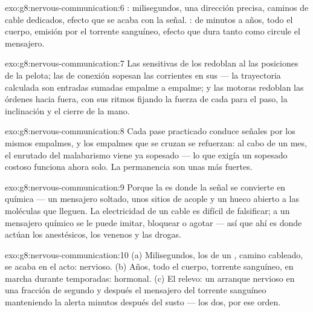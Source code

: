 \begin{solution}{exo:g8:nervous-communication:6}
: milisegundos, una dirección precisa, caminos de cable
dedicados, efecto que se acaba con la señal. : de minutos a
años, todo el cuerpo, emisión por el torrente sanguíneo, efecto que
dura tanto como circule el mensajero.
\end{solution}

\begin{solution}{exo:g8:nervous-communication:7}
Las  sensitivas de los  redoblan al  las posiciones
de la pelota; las  de conexión sopesan las corrientes en sus
 --- la trayectoria calculada son entradas sumadas empalme a
empalme; y las  motoras redoblan las órdenes hacia fuera, con
sus ritmos fijando la fuerza de cada  para el paso, la
inclinación y el cierre de la mano.
\end{solution}

\begin{solution}{exo:g8:nervous-communication:8}
Cada pase practicado conduce señales por los mismos empalmes, y los
empalmes que se cruzan se refuerzan: al cabo de un mes, el enrutado del
malabarismo viene ya sopesado --- lo que exigía un sopesado costoso
funciona ahora solo. La permanencia son unas  más fuertes.
\end{solution}

\begin{solution}{exo:g8:nervous-communication:9}
Porque la  es donde la señal se convierte en química --- un
mensajero soltado, unos sitios de acople y un hueco abierto a las
moléculas que lleguen. La electricidad de un cable es difícil de
falsificar; a un mensajero químico se le puede imitar, bloquear o
agotar --- así que ahí es donde actúan los anestésicos, los venenos y
las drogas.
\end{solution}

\begin{solution}{exo:g8:nervous-communication:10}
(a) Milisegundos, los  de un , camino cableado, se acaba
en el acto: nervioso. (b) Años, todo el cuerpo, torrente sanguíneo, en
marcha durante temporadas: hormonal. (c) El relevo: un arranque
nervioso en una fracción de segundo y después el mensajero del torrente
sanguíneo manteniendo la alerta minutos después del susto --- los dos,
por ese orden.
\end{solution}

